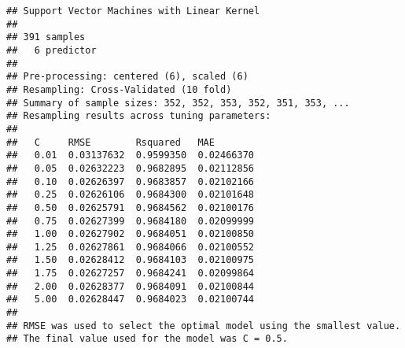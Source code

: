 \documentclass[
]{article}
\begin{document}
\begin{verbatim}
## Support Vector Machines with Linear Kernel 
## 
## 391 samples
##   6 predictor
## 
## Pre-processing: centered (6), scaled (6) 
## Resampling: Cross-Validated (10 fold) 
## Summary of sample sizes: 352, 352, 353, 352, 351, 353, ... 
## Resampling results across tuning parameters:
## 
##   C     RMSE        Rsquared   MAE       
##   0.01  0.03137632  0.9599350  0.02466370
##   0.05  0.02632223  0.9682895  0.02112856
##   0.10  0.02626397  0.9683857  0.02102166
##   0.25  0.02626106  0.9684300  0.02101648
##   0.50  0.02625791  0.9684562  0.02100176
##   0.75  0.02627399  0.9684180  0.02099999
##   1.00  0.02627902  0.9684051  0.02100850
##   1.25  0.02627861  0.9684066  0.02100552
##   1.50  0.02628412  0.9684103  0.02100975
##   1.75  0.02627257  0.9684241  0.02099864
##   2.00  0.02628377  0.9684091  0.02100844
##   5.00  0.02628447  0.9684023  0.02100744
## 
## RMSE was used to select the optimal model using the smallest value.
## The final value used for the model was C = 0.5.
\end{verbatim}
\end{document}
